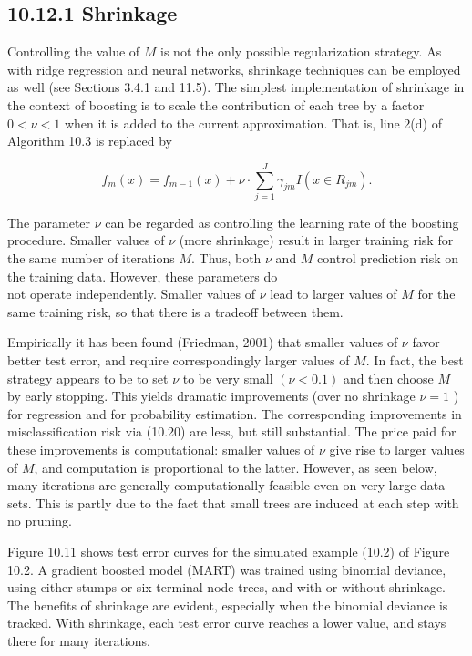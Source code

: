 \documentclass[10pt]{article}
\begin{document}
\subsection*{10.12.1 Shrinkage}
Controlling the value of $M$ is not the only possible regularization strategy. As with ridge regression and neural networks, shrinkage techniques can be employed as well (see Sections 3.4.1 and 11.5). The simplest implementation of shrinkage in the context of boosting is to scale the contribution of each tree by a factor $0<\nu<1$ when it is added to the current approximation. That is, line 2(d) of Algorithm 10.3 is replaced by


\begin{equation*}
f_{m}(x)=f_{m-1}(x)+\nu \cdot \sum_{j=1}^{J} \gamma_{j m} I\left(x \in R_{j m}\right) . \tag{10.41}
\end{equation*}


The parameter $\nu$ can be regarded as controlling the learning rate of the boosting procedure. Smaller values of $\nu$ (more shrinkage) result in larger training risk for the same number of iterations $M$. Thus, both $\nu$ and $M$ control prediction risk on the training data. However, these parameters do\\
not operate independently. Smaller values of $\nu$ lead to larger values of $M$ for the same training risk, so that there is a tradeoff between them.

Empirically it has been found (Friedman, 2001) that smaller values of $\nu$ favor better test error, and require correspondingly larger values of $M$. In fact, the best strategy appears to be to set $\nu$ to be very small $(\nu<0.1)$ and then choose $M$ by early stopping. This yields dramatic improvements (over no shrinkage $\nu=1$ ) for regression and for probability estimation. The corresponding improvements in misclassification risk via (10.20) are less, but still substantial. The price paid for these improvements is computational: smaller values of $\nu$ give rise to larger values of $M$, and computation is proportional to the latter. However, as seen below, many iterations are generally computationally feasible even on very large data sets. This is partly due to the fact that small trees are induced at each step with no pruning.

Figure 10.11 shows test error curves for the simulated example (10.2) of Figure 10.2. A gradient boosted model (MART) was trained using binomial deviance, using either stumps or six terminal-node trees, and with or without shrinkage. The benefits of shrinkage are evident, especially when the binomial deviance is tracked. With shrinkage, each test error curve reaches a lower value, and stays there for many iterations.
\end{document}
